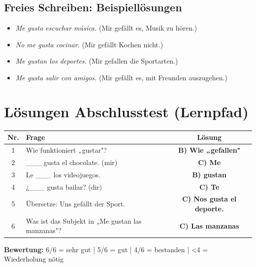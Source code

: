 \documentclass[10pt, a4paper]{article}
\newcommand{\es}[1]{\textcolor{spanisch}{\textit{#1}}}
\newcommand{\loesung}[1]{\textcolor{success}{\textbf{#1}}}
\begin{document}
\subsection*{Freies Schreiben: Beispiellösungen}

\begin{itemize}[nosep, leftmargin=2em]
    \item \es{Me gusta escuchar música.} (Mir gefällt es, Musik zu hören.)
    \item \es{No me gusta cocinar.} (Mir gefällt Kochen nicht.)
    \item \es{Me gustan los deportes.} (Mir gefallen die Sportarten.)
    \item \es{Me gusta salir con amigos.} (Mir gefällt es, mit Freunden auszugehen.)
\end{itemize}


\section{Lösungen Abschlusstest (Lernpfad)}

\begin{tabularx}{\textwidth}{|c|X|c|}
    \hline
    \textbf{Nr.} & \textbf{Frage} & \textbf{Lösung} \\
    \hline
    1 & Wie funktioniert „gustar"? & \loesung{B) Wie „gefallen"} \\
    \hline
    2 & \_\_\_ gusta el chocolate. (mir) & \loesung{C) Me} \\
    \hline
    3 & Le \_\_\_ los videojuegos. & \loesung{B) gustan} \\
    \hline
    4 & ¿\_\_\_ gusta bailar? (dir) & \loesung{C) Te} \\
    \hline
    5 & Übersetze: Uns gefällt der Sport. & \loesung{C) Nos gusta el deporte.} \\
    \hline
    6 & Was ist das Subjekt in „Me gustan las manzanas"? & \loesung{C) Las manzanas} \\
    \hline
\end{tabularx}

\textbf{Bewertung:} 6/6 = sehr gut | 5/6 = gut | 4/6 = bestanden | <4 = Wiederholung nötig

\end{document}
